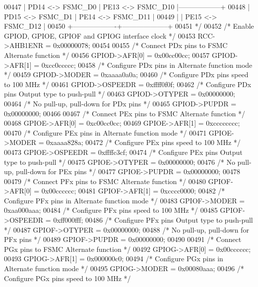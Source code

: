 \begin{DoxyCode}
00447 \textcolor{comment}{ | PD14 <-> FSMC\_D0  | PE13 <-> FSMC\_D10  |------------------+}
00448 \textcolor{comment}{ | PD15 <-> FSMC\_D1  | PE14 <-> FSMC\_D11  |}
00449 \textcolor{comment}{ |                   | PE15 <-> FSMC\_D12  |}
00450 \textcolor{comment}{ +-------------------+--------------------+}
00451 \textcolor{comment}{*/}
00452    \textcolor{comment}{/* Enable GPIOD, GPIOE, GPIOF and GPIOG interface clock */}
00453   RCC->AHB1ENR   = 0x00000078;
00454 
00455   \textcolor{comment}{/* Connect PDx pins to FSMC Alternate function */}
00456   GPIOD->AFR[0]  = 0x00cc00cc;
00457   GPIOD->AFR[1]  = 0xcc0ccccc;
00458   \textcolor{comment}{/* Configure PDx pins in Alternate function mode */}
00459   GPIOD->MODER   = 0xaaaa0a0a;
00460   \textcolor{comment}{/* Configure PDx pins speed to 100 MHz */}
00461   GPIOD->OSPEEDR = 0xffff0f0f;
00462   \textcolor{comment}{/* Configure PDx pins Output type to push-pull */}
00463   GPIOD->OTYPER  = 0x00000000;
00464   \textcolor{comment}{/* No pull-up, pull-down for PDx pins */}
00465   GPIOD->PUPDR   = 0x00000000;
00466 
00467   \textcolor{comment}{/* Connect PEx pins to FSMC Alternate function */}
00468   GPIOE->AFR[0]  = 0xc00cc0cc;
00469   GPIOE->AFR[1]  = 0xcccccccc;
00470   \textcolor{comment}{/* Configure PEx pins in Alternate function mode */}
00471   GPIOE->MODER   = 0xaaaa828a;
00472   \textcolor{comment}{/* Configure PEx pins speed to 100 MHz */}
00473   GPIOE->OSPEEDR = 0xffffc3cf;
00474   \textcolor{comment}{/* Configure PEx pins Output type to push-pull */}
00475   GPIOE->OTYPER  = 0x00000000;
00476   \textcolor{comment}{/* No pull-up, pull-down for PEx pins */}
00477   GPIOE->PUPDR   = 0x00000000;
00478 
00479   \textcolor{comment}{/* Connect PFx pins to FSMC Alternate function */}
00480   GPIOF->AFR[0]  = 0x00cccccc;
00481   GPIOF->AFR[1]  = 0xcccc0000;
00482   \textcolor{comment}{/* Configure PFx pins in Alternate function mode */}
00483   GPIOF->MODER   = 0xaa000aaa;
00484   \textcolor{comment}{/* Configure PFx pins speed to 100 MHz */}
00485   GPIOF->OSPEEDR = 0xff000fff;
00486   \textcolor{comment}{/* Configure PFx pins Output type to push-pull */}
00487   GPIOF->OTYPER  = 0x00000000;
00488   \textcolor{comment}{/* No pull-up, pull-down for PFx pins */}
00489   GPIOF->PUPDR   = 0x00000000;
00490 
00491   \textcolor{comment}{/* Connect PGx pins to FSMC Alternate function */}
00492   GPIOG->AFR[0]  = 0x00cccccc;
00493   GPIOG->AFR[1]  = 0x000000c0;
00494   \textcolor{comment}{/* Configure PGx pins in Alternate function mode */}
00495   GPIOG->MODER   = 0x00080aaa;
00496   \textcolor{comment}{/* Configure PGx pins speed to 100 MHz */}

\end{DoxyCode}
